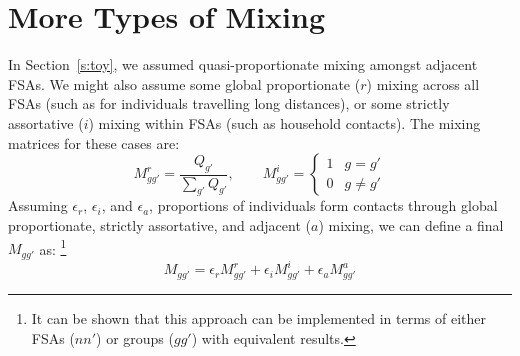\documentclass{article}
\begin{document}
  \section{More Types of Mixing}\label{s:more}
  In Section~\ref{s:toy}, we assumed quasi-proportionate mixing amongst adjacent FSAs.
  We might also assume some global proportionate ($r$) mixing across all FSAs
  (such as for individuals travelling long distances),
  or some strictly assortative ($i$) mixing within FSAs
  (such as household contacts).
  The mixing matrices for these cases are:
  \begin{equation}
    M_{gg'}^{r} = \frac{Q_{g'}}{\sum_{g'}Q_{g'}}
    ,\qquad
    M_{gg'}^{i} = \begin{cases} 1 & g = g'\\0 & g \ne g' \end{cases}
  \end{equation}
  Assuming $\epsilon_r$, $\epsilon_i$, and $\epsilon_a$, proportions of individuals form contacts
  through global proportionate, strictly assortative, and adjacent ($a$) mixing,
  we can define a final $M_{gg'}$ as:%
  \footnote{It can be shown that this approach can be implemented in terms of
    either FSAs ($nn'$) or groups ($gg'$) with equivalent results.}
  \begin{equation}
    M_{gg'} = \epsilon_r M_{gg'}^r + \epsilon_i M_{gg'}^i + \epsilon_a M_{gg'}^a
  \end{equation}
\end{document}
